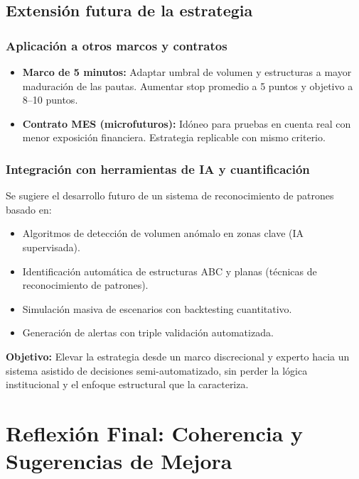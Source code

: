 \subsection*{Extensi\'on futura de la estrategia}

\subsubsection*{Aplicaci\'on a otros marcos y contratos}

\begin{itemize}
    \item \textbf{Marco de 5 minutos:} Adaptar umbral de volumen y estructuras a mayor maduraci\'on de las pautas. Aumentar stop promedio a 5 puntos y objetivo a 8–10 puntos.
    \item \textbf{Contrato MES (microfuturos):} Id\'oneo para pruebas en cuenta real con menor exposici\'on financiera. Estrategia replicable con mismo criterio.
\end{itemize}

\subsubsection*{Integraci\'on con herramientas de IA y cuantificaci\'on}

Se sugiere el desarrollo futuro de un sistema de reconocimiento de patrones basado en:

\begin{itemize}
    \item Algoritmos de detecci\'on de volumen an\'omalo en zonas clave (IA supervisada).
    \item Identificaci\'on autom\'atica de estructuras ABC y planas (t\'ecnicas de reconocimiento de patrones).
    \item Simulaci\'on masiva de escenarios con backtesting cuantitativo.
    \item Generaci\'on de alertas con triple validaci\'on automatizada.
\end{itemize}

\textbf{Objetivo:} Elevar la estrategia desde un marco discrecional y experto hacia un sistema asistido de decisiones semi-automatizado, sin perder la l\'ogica institucional y el enfoque estructural que la caracteriza.

\section*{Reflexi\'on Final: Coherencia y Sugerencias de Mejora}


